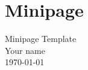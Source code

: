 \section{Minipage}\label{sec:minipage}
 
 \begin{minipage}{5in} %
 	\Large Minipage Template \\
 	\large Your name \\
 	\today \\[1.5em] %
 \end{minipage}
